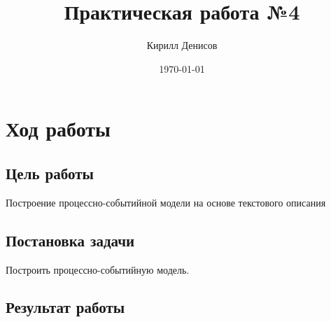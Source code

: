 \documentclass[a4paper,14pt]{extarticle}
\author{Кирилл Денисов}
\title{Практическая работа №4}
\date{\today}
\newcommand{\pathToCommonFolder}{/home/denilai/Documents/repos/latex/Common}
\begin{document}
	\thispagestyle{empty}
	
	\newpage
	\newpage
\section*{Ход работы}

\subsection*{Цель работы}
Построение процессно-событийной модели на основе текстового описания


\subsection*{Постановка задачи}
Построить процессно-событийную модель.


\subsection*{Результат работы}
\end{document}
